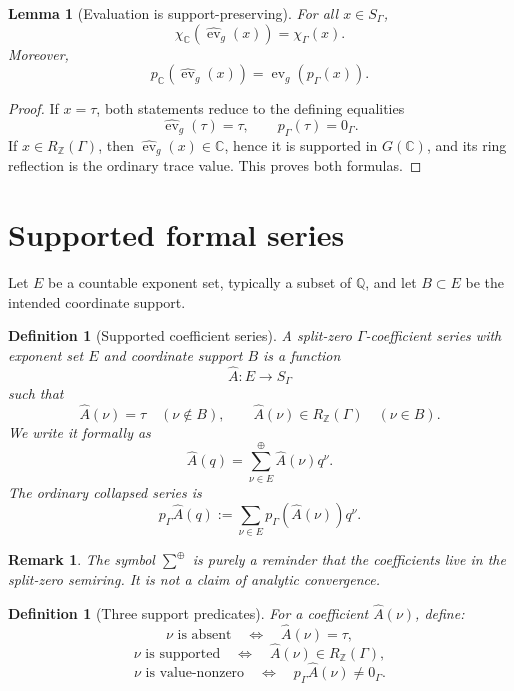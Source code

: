 \documentclass[11pt]{article}
\newtheorem{lemma}[theorem]{Lemma}
\newtheorem{definition}[theorem]{Definition}
\newtheorem{remark}[theorem]{Remark}
\newcommand{\ZZ}{\mathbb Z}
\newcommand{\QQ}{\mathbb Q}
\newcommand{\CC}{\mathbb C}
\newcommand{\ev}{\operatorname{ev}}
\begin{document}
\begin{lemma}[Evaluation is support-preserving]
For all \(x\in S_\Gamma\),
\[
\chi_\CC(\widehat{\ev}_g(x))=\chi_\Gamma(x).
\]
Moreover,
\[
p_\CC(\widehat{\ev}_g(x))=\ev_g(p_\Gamma(x)).
\]
\end{lemma}

\begin{proof}
If \(x=\tau\), both statements reduce to the defining equalities
\[
\widehat{\ev}_g(\tau)=\tau,
\qquad
p_\Gamma(\tau)=0_\Gamma.
\]
If \(x\in R_\ZZ(\Gamma)\), then \(\widehat{\ev}_g(x)\in\CC\), hence it is supported in \(G(\CC)\), and its ring reflection is the ordinary trace value.  This proves both formulas.
\end{proof}

\section{Supported formal series}

Let \(E\) be a countable exponent set, typically a subset of \(\QQ\), and let \(B\subset E\) be the intended coordinate support.

\begin{definition}[Supported coefficient series]
A split-zero \(\Gamma\)-coefficient series with exponent set \(E\) and coordinate support \(B\) is a function
\[
\widehat A:E\to S_\Gamma
\]
such that
\[
\widehat A(\nu)=\tau\quad(\nu\notin B),
\qquad
\widehat A(\nu)\in R_\ZZ(\Gamma)\quad(\nu\in B).
\]
We write it formally as
\[
\widehat A(q)=\sum_{\nu\in E}^{\oplus}\widehat A(\nu)q^\nu.
\]
The ordinary collapsed series is
\[
p_\Gamma\widehat A(q):=\sum_{\nu\in E}p_\Gamma(\widehat A(\nu))q^\nu.
\]
\end{definition}

\begin{remark}
The symbol \(\sum^\oplus\) is purely a reminder that the coefficients live in the split-zero semiring.  It is not a claim of analytic convergence.
\end{remark}

\begin{definition}[Three support predicates]
For a coefficient \(\widehat A(\nu)\), define:
\[
\nu\text{ is absent}\quad\Longleftrightarrow\quad \widehat A(\nu)=\tau,
\]
\[
\nu\text{ is supported}\quad\Longleftrightarrow\quad \widehat A(\nu)\in R_\ZZ(\Gamma),
\]
\[
\nu\text{ is value-nonzero}\quad\Longleftrightarrow\quad p_\Gamma\widehat A(\nu)\ne0_\Gamma.
\]
\end{definition}
\end{document}
